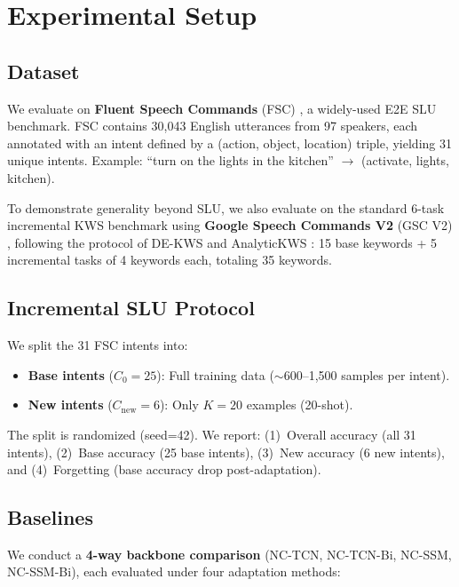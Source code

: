 \documentclass[11pt]{article}
\begin{document}
\section{Experimental Setup}

\subsection{Dataset}

We evaluate on \textbf{Fluent Speech Commands} (FSC) \cite{lugosch2019speech}, a widely-used E2E SLU benchmark.
FSC contains 30,043 English utterances from 97 speakers, each annotated with an intent defined by a (action, object, location) triple, yielding 31 unique intents.
Example: ``turn on the lights in the kitchen'' $\rightarrow$ (activate, lights, kitchen).

To demonstrate generality beyond SLU, we also evaluate on the standard 6-task incremental KWS benchmark using \textbf{Google Speech Commands V2} (GSC V2) \cite{warden2018speech}, following the protocol of DE-KWS \cite{dekws2025} and AnalyticKWS \cite{analytickws2025}: 15 base keywords + 5 incremental tasks of 4 keywords each, totaling 35 keywords.

\subsection{Incremental SLU Protocol}

We split the 31 FSC intents into:
\begin{itemize}
\setlength\itemsep{0pt}
\item \textbf{Base intents} ($C_0 = 25$): Full training data ($\sim$600--1,500 samples per intent).
\item \textbf{New intents} ($C_{\text{new}} = 6$): Only $K=20$ examples (20-shot).
\end{itemize}

The split is randomized (seed=42).
We report: (1)~Overall accuracy (all 31 intents), (2)~Base accuracy (25 base intents), (3)~New accuracy (6 new intents), and (4)~Forgetting (base accuracy drop post-adaptation).

\subsection{Baselines}

We conduct a \textbf{4-way backbone comparison} (NC-TCN, NC-TCN-Bi, NC-SSM, NC-SSM-Bi), each evaluated under four adaptation methods:
\end{document}
